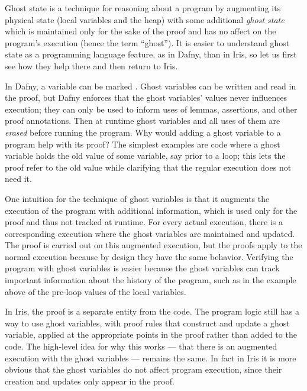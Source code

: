 
Ghost state is a technique for reasoning about a program by augmenting its
physical state (local variables and the heap) with some additional \emph{ghost
state} which is maintained only for the sake of the proof and has no affect on
the program's execution (hence the term ``ghost''). It is easier to understand
ghost state as a programming language feature, as in Dafny, than in Iris, so let
us first see how they help there and then return to Iris.

In Dafny, a variable can be marked . Ghost variables can be written
and read in the proof, but Dafny enforces that the ghost variables' values never
influences execution; they can only be used to inform uses of lemmas,
assertions, and other proof annotations. Then at runtime ghost variables and all
uses of them are \emph{erased} before running the program. Why would adding a
ghost variable to a program help with its proof? The simplest examples are code
where a ghost variable holds the old value of some variable, say prior to a
loop; this lets the proof refer to the old value while clarifying that the
regular execution does not need it.


One intuition for the technique of ghost variables is that it augments the
execution of the program with additional information, which is used only for the proof
and thus not tracked at runtime. For every actual execution, there is a
corresponding execution where the ghost variables are maintained and updated.
The proof is carried out on this augmented execution,
but the proofs apply to the normal execution because by design they have the
same behavior. Verifying the program with ghost
variables is easier because the ghost variables can track important
information about the history of the program, such as in the example above of
the pre-loop values of the local variables.

In Iris, the proof is a separate entity from the code. The program logic still
has a way to use ghost variables, with proof rules that construct and update a
ghost variable, applied at the appropriate points in the proof rather than added
to the code. The high-level idea for why this works --- that there is an
augmented execution with the ghost variables ---
remains the same. In fact in Iris it is more obvious
that the ghost variables do not affect program execution, since their creation
and updates only appear in the proof.

